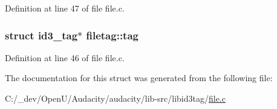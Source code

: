 Definition at line 47 of file file.\+c.

\subsubsection[{\texorpdfstring{tag}{tag}}]{\setlength{\rightskip}{0pt plus 5cm}struct {\bf id3\+\_\+tag}$\ast$ filetag\+::tag}\hypertarget{structfiletag_a1864ce9078af1273318ffa8433a6fbda}{}\label{structfiletag_a1864ce9078af1273318ffa8433a6fbda}


Definition at line 46 of file file.\+c.



The documentation for this struct was generated from the following file\+:\begin{DoxyCompactItemize}
\item 
C\+:/\+\_\+dev/\+Open\+U/\+Audacity/audacity/lib-\/src/libid3tag/\hyperlink{libid3tag_2file_8c}{file.\+c}\end{DoxyCompactItemize}
